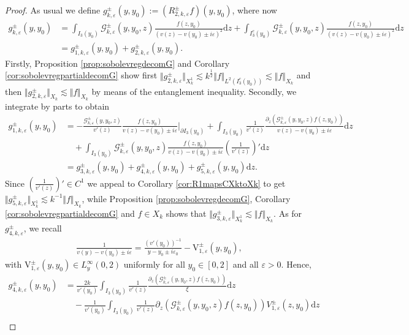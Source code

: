 \documentclass[11pt,reqno]{amsproc}
\theoremstyle{definition}
\numberwithin{equation}{section}
\newcommand{\G}{{\mathcal{G}}}
\renewcommand{\d}{\mathrm{d}}
\newcommand{\ep}{\varepsilon}
\begin{document}
\begin{proof}
As usual we define $g_{k,\ep}^\pm(y,y_0):=(R_{2,k,\ep}^\pm f)(y,y_0)$, where now
\begin{align*}
g_{k,\ep}^\pm (y,y_0) &= \int_{I_3(y_0)}  \G_{k,\ep}^\pm (y,y_0,z) \frac{f(z,y_0)}{(v(z)-v(y_0)\pm i\ep)^2} \d z + \int_{I_3^c(y_0)}  \G_{k,\ep}^\pm (y,y_0,z) \frac{f(z,y_0)}{(v(z)-v(y_0)\pm i\ep)^2} \d z \\
&= g_{1,k,\ep}^\pm(y,y_0) + g_{2,k,\ep}^\pm(y,y_0).
\end{align*}
Firstly, Proposition \ref{prop:sobolevregdecomG} and Corollary \ref{cor:sobolevregpartialdecomG} show first $\Vert g_{2,k,\ep}^\pm\Vert_{X_k^1}\lesssim k^\frac12\Vert f \Vert_{L^2(I_3^c(y_0))} \lesssim \Vert f \Vert_{X_k}$ and then $\Vert g_{2,k,\ep}^\pm \Vert_{X_k}\lesssim \Vert f \Vert_{X_k}$ by means of the entanglement inequality. Secondly, we integrate by parts to obtain
\begin{align*}
g_{1,k,\ep}^\pm(y,y_0) &= - \frac{\G_{k,\ep}^\pm(y,y_0,z)}{v'(z)}\frac{f(z,y_0)}{v(z) - v(y_0) \pm i\ep}\Big|_{\partial I_3(y_0)} + \int_{I_3(y_0)} \frac{1}{v'(z)} \frac{ \partial_z \left( \G_{k,\ep}^\pm(y,y_0,z)f(z,y_0)	\right)  }{v(z) - v(y_0) \pm i\ep} \d z\\
&\quad +\int_{I_3(y_0)} \G_{k,\ep}^\pm(y,y_0,z) \frac{f(z,y_0)}{v(z) - v(y_0) \pm i\ep}\left( \frac{1}{v'(z)} \right)' \d z \\
&= g_{3,k,\ep}^\pm(y,y_0) + g_{4,k,\ep}^\pm(y,y_0) + g_{5,k,\ep}^\pm(y,y_0) \d z.
\end{align*}
Since $\left( \tfrac{1}{v'(z)} \right)' \in C^1$ we appeal to Corollary \ref{cor:R1mapsCXktoXk} to get $\Vert g_{5,k,\ep}^\pm \Vert_{X_k^1} \lesssim k^{-1}\Vert f \Vert_{X_k}$, while Proposition \ref{prop:sobolevregdecomG}, Corollary \ref{cor:sobolevregpartialdecomG}  and $f\in X_k$ shows that $\Vert g_{3,k,\ep}^\pm\Vert_{X_k^1}\lesssim \Vert f \Vert_{X_k}$. As for $g_{4,k,\ep}^\pm$, we recall
\begin{align*}
\frac{1}{v(y) - v(y_0) \pm i\ep} = \frac{(v'(y_0))^{-1}}{y-y_0\pm i\ep_0} - \mathrm{V}_{1,\ep}^\pm(y,y_0),
\end{align*}
with $\mathrm{V}_{1,\ep}^\pm(y,y_0)\in L_y^\infty(0,2)$ uniformly for all $y_0\in [0,2]$ and all $\ep>0$. Hence,
\begin{align*}
g_{4,k,\ep}^\pm(y,y_0) &= \frac{2k}{v'(y_0)}\int_{I_3(y_0)} \frac{1}{v'(z)}\frac{\partial_z \left(\G_{k,\ep}^\pm(y,y_0,z)f(z,y_0)\right)}{\xi} \d z \\
&\quad- \frac{1}{v'(y_0)}\int_{I_3(y_0)} \frac{1}{v'(z)}\partial_z \left(\G_{k,\ep}^\pm(y,y_0,z)f(z,y_0)\right) V_{1,\ep}^\pm(z,y_0) \d z\\

\end{align*}
\end{proof}
\end{document}
